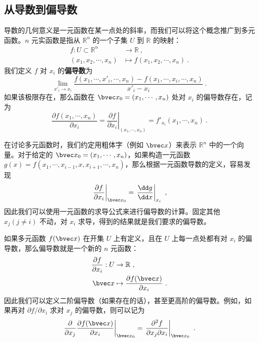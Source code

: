 
\subsection{从导数到偏导数}
导数的几何意义是一元函数在某一点处的斜率，而我们可以将这个概念推广到多元函数。$n$ 元实函数是指从 $\mathbb{R} ^n$ 的一个子集 $U$ 到 $\mathbb{R}$ 的映射：
\begin{equation}
\begin{aligned}
f:U\subset \mathbb{R} ^n&\rightarrow \mathbb{R}~,\\
(x_1,x_2,\cdots,x_n)&\mapsto f(x_1,x_2,\cdots,x_n)~.
\end{aligned}
\end{equation}
我们定义 $f$ 对 $x_i$ 的\textbf{偏导数}为
\begin{equation}
\lim\limits_{x'_i\rightarrow x_{i}}\frac{f(x_1,\cdots,x'_i,\cdots,x_n)-f(x_1,\cdots,x_i,\cdots,x_n)}{x'_i-x_i}~.
\end{equation}
如果该极限存在，那么函数在 $\bvec x_0=(x_1,\cdots,x_n)$ 处对 $x_i$ 的偏导数存在，记为
\begin{equation}
\frac{\partial f(x_1,\cdots,x_n)}{\partial x_i}=\left.\frac{\partial f}{\partial x_i}\right|_{(x_1,\cdots,x_n)}=f'_{x_i}(x_1,\cdots,x_n)~.
\end{equation}

在讨论多元函数时，我们约定用粗体字（例如 $\bvec x$）来表示 $\mathbb{R}^n$ 中的一个向量。对于给定的 $\bvec x_0=(x_1,\cdots,x_n)$，如果构造一元函数 $g(x)=f(x_1,\cdots,x_{i-1},x,x_{i+1},\cdots,x_n)$，那么根据一元函数导数的定义，容易发现
\begin{equation}
\left.\frac{\partial f}{\partial x_i}\right|_{\bvec x_0}=\left.\frac{\dd g}{\dd x}\right|_{x_i}~,
\end{equation}
因此我们可以使用一元函数的求导公式来进行偏导数的计算。固定其他 $x_j(j\neq i)$ 不动，对 $x_i$ 求导，得到的结果就是我们要求的偏导数。

如果多元函数 $f(\bvec x)$ 在开集 $U$ 上有定义，且在 $U$ 上每一点处都有对 $x_i$ 的偏导数，那么偏导数就是一个新的 $n$ 元函数：
\begin{equation}
\begin{aligned}
\frac{\partial f}{\partial x_i}: U&\rightarrow \mathbb{R}~,\\
\bvec x&\mapsto \frac{\partial f(\bvec x)}{\partial x_i}~.
\end{aligned}
\end{equation}
因此我们可以定义二阶偏导数（如果存在的话），甚至更高阶的偏导数。例如，如果再对 $\partial f/\partial x_i$ 求对 $x_j$ 的偏导数，则可以记为
\begin{equation}
\left.\frac{\partial}{\partial x_j} \frac{\partial f(\bvec x)}{\partial x_i}\right|_{\bvec x_0}=\left.\frac{\partial^2 f}{\partial x_j\partial x_i }\right|_{\bvec x_0}~.
\end{equation}

